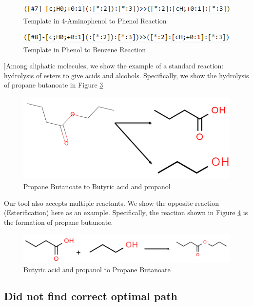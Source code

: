 \documentclass[preprint,12pt]{elsarticle}
\begin{document}
\begin{figure}[h]
\centering\includegraphics[width=1\linewidth]{templates_aminophenol_to_phenol}
\caption{Template in 4-Aminophenol to Phenol Reaction}
\label{fig:smart1}
\end{figure}

\begin{figure}[h]
\centering\includegraphics[width=1\linewidth]{templates_phenol_to_benzene}
\caption{Template in Phenol to Benzene Reaction}
\label{fig:smart2}
\end{figure}

]Among aliphatic molecules, we show the example of a standard reaction: hydrolysis of esters to give acids and alcohols. Specifically, we show the hydrolysis of propane butanoate in Figure \ref{fig:butanoate_reaction}

\begin{figure}[h]
\centering\includegraphics[width=0.6\linewidth]{proponate_to_acid_alcohol}
\caption{Propane Butanoate to Butyric acid and propanol}
\label{fig:butanoate_reaction}
\end{figure}

Our tool also accepts multiple reactants. We show the opposite reaction (Esterification) here as an example. Specifically, the reaction shown in Figure \ref{fig:form_propane_butanoate} is the formation of propane butanoate. 

\begin{figure}[h]
\centering\includegraphics[width=0.8\linewidth]{acid_plus_alcohol_to_ester}
\caption{Butyric acid and propanol to Propane Butanoate}
\label{fig:form_propane_butanoate}
\end{figure}

 \subsection{Did not find correct optimal path}
 
\end{document}
